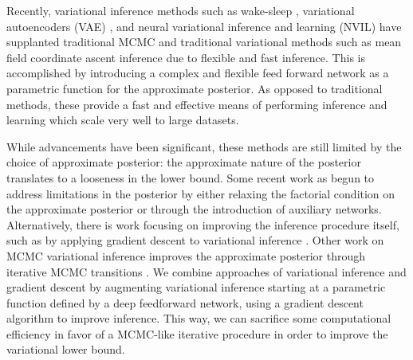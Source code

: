 \documentclass[preprint, twocolumn]{article}
\begin{document}
Recently, variational inference methods such as wake-sleep \cite{hinton1995wake, bornschein2014reweighted}, variational autoencoders (VAE) \cite{kingma2013auto}, and neural variational inference and learning (NVIL) \cite{mnih2014neural} have supplanted traditional MCMC and traditional variational methods such as mean field coordinate ascent inference due to flexible and fast inference. This is accomplished by introducing a complex and flexible feed forward network as a parametric function for the approximate posterior. As opposed to traditional methods, these provide a fast and effective means of performing inference and learning which scale very well to large datasets.

While advancements have been significant, these methods are still limited by the choice of approximate posterior: the approximate nature of the posterior translates to a looseness in the lower bound. Some recent work as begun to address limitations in the posterior by either relaxing the factorial condition \cite{burda2015importance} on the approximate posterior or through the introduction of auxiliary networks. Alternatively, there is work focusing on improving the inference procedure itself, such as by applying gradient descent to variational inference \cite{hoffman2013stochastic}. Other work on MCMC variational inference improves the approximate posterior through iterative MCMC transitions \cite{salimans2014markov}. We combine approaches of variational inference and gradient descent by augmenting variational inference starting at a parametric function defined by a deep feedforward network, using a gradient descent algorithm to improve inference. This way, we can sacrifice some computational efficiency in favor of a MCMC-like iterative procedure in order to improve the variational lower bound.
\end{document}
